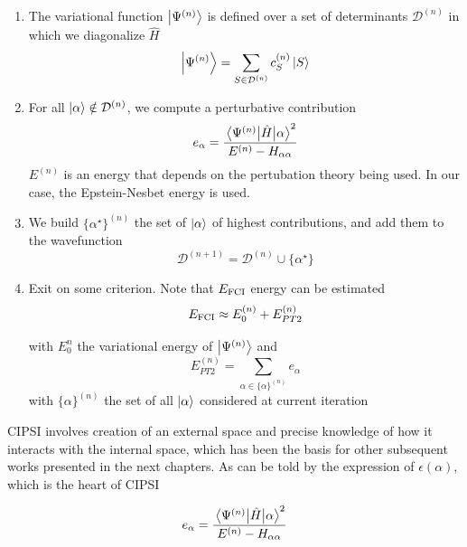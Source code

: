 \documentclass[./thesis.tex]{subfiles}
\begin{document}
\begin{enumerate}
\item

The variational function $\ket {\Psi^{(n)}}$ is defined over a set of determinants $  \mathcal{D}^{(n)}$ in which we diagonalize $\widehat{H}$
\begin{equation}
\ket{\Psi^{(n)}} = \sum_{S \in \mathcal{D}^{(n)}} c_S^{(n)} \ket{S}
\end{equation}

\item
For all ${\ket{\alpha}} \notin \mathcal{D}^{(n)}$, we compute a perturbative contribution
\begin{equation}
e_\alpha = \frac{\mel{\Psi^{(n)}}{\hat{H}}{\alpha}^2}{E^{(n)} - H_{\alpha \alpha}}
\end{equation}
$E^{(n)}$ is an energy that depends on the pertubation theory being used. In our case, the Epstein-Nesbet energy is used.

\item
We build $\{ \alpha^\star \}^{(n)}$ the set of ${\ket{\alpha}}$ of highest contributions, and add them to the wavefunction
\begin{equation}
\mathcal{D}^{(n+1)} = \mathcal{D}^{(n)} \cup \{ \alpha^\star \}
\end{equation}

\item
Exit on some criterion. Note that $E_\text{FCI}$ energy can be estimated
\begin{equation}
E_\text{FCI} \approx E^{(n)}_0 + E_{PT2}^{(n)}
\end{equation}


with $E^n_0$ the variational energy of $\ket {\Psi^{(n)}}$ and
\begin{equation}
E_{PT2}^{(n)} = \sum_{\alpha \in \{\alpha \}^{(n)}} e_\alpha
\end{equation}
with $\{ \alpha \}^{(n)}$ the set of all ${\ket{\alpha}}$ considered at current iteration

\end{enumerate}


CIPSI involves creation of an external space and precise knowledge of how it interacts with the internal space, which has been the basis for other subsequent works presented in the next chapters.
As can be told by the expression of $\epsilon(\alpha)$, which is the heart of CIPSI

\begin{equation}
e_\alpha = \frac{\mel{\Psi^{(n)}}{\hat{H}}{\alpha}^2}{E^{(n)} - H_{\alpha \alpha}}
\end{equation}
\end{document}
